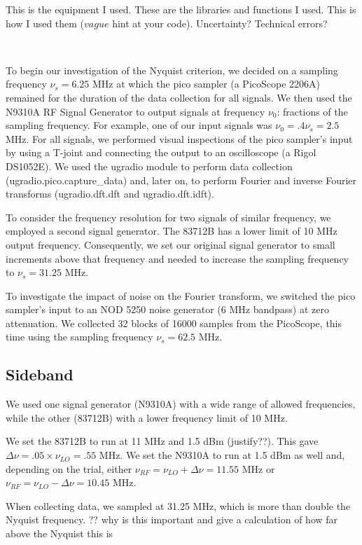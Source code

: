\documentclass[a4paper]{article}
\begin{document}
\quad This is the equipment I used. These are the libraries and functions I used. This is how I used them ($vague$ hint at your code). Uncertainty? Technical errors?

\

\quad To begin our investigation of the Nyquist criterion, we decided on a sampling frequency $\nu_s = 6.25$ MHz at which the pico sampler (a PicoScope 2206A) remained for the duration of the data collection for all signals. We then used the N9310A RF Signal Generator to output signals at frequency $\nu_0$: fractions of the sampling frequency. For example, one of our input signals was $\nu_0 = .4 \nu_s = 2.5$ MHz. For all signals, we performed visual inspections of the pico sampler's input by using a T-joint and connecting the output to an oscilloscope (a Rigol DS1052E). We used the ugradio module to perform data collection (ugradio.pico.capture\_data) and, later on, to perform Fourier and inverse Fourier transforms (ugradio.dft.dft and ugradio.dft.idft).

\quad To consider the frequency resolution for two signals of similar frequency, we employed a second signal generator. The 83712B has a lower limit of 10 MHz output frequency. Consequently, we set our original signal generator to small increments above that frequency and needed to increase the sampling frequency to $\nu_s = 31.25$ MHz.

\quad To investigate the impact of noise on the Fourier transform, we switched the pico sampler's input to an NOD 5250 noise generator (6 MHz bandpass) at zero attenuation. We collected 32 blocks of 16000 samples from the PicoScope, this time using the sampling frequency $\nu_s = 62.5$ MHz.

\subsection{Sideband}

We used one signal generator (N9310A) with a wide range of allowed frequencies, while the other (83712B) with a lower frequency limit of 10 MHz. 

We set the 83712B to run at 11 MHz and 1.5 dBm (justify??). This gave $\Delta \nu = .05 \times \nu_{LO} = .55$ MHz. We set the N9310A to run at 1.5 dBm as well and, depending on the trial, either $\nu_{RF} = \nu_{LO} + \Delta \nu = 11.55$ MHz or $\nu_{RF} = \nu_{LO} - \Delta \nu = 10.45$ MHz. 

When collecting data, we sampled at 31.25 MHz, which is more than double the Nyquist frequency. ?? why is this important and give a calculation of how far above the Nyquist this is
\end{document}
